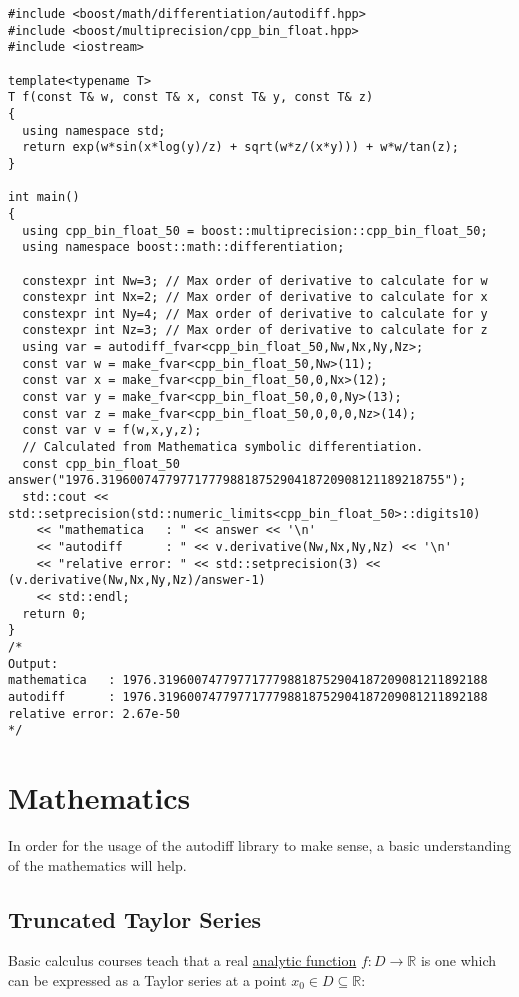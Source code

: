 \documentclass{article}
\begin{document}
\begin{verbatim}
#include <boost/math/differentiation/autodiff.hpp>
#include <boost/multiprecision/cpp_bin_float.hpp>
#include <iostream>

template<typename T>
T f(const T& w, const T& x, const T& y, const T& z)
{
  using namespace std;
  return exp(w*sin(x*log(y)/z) + sqrt(w*z/(x*y))) + w*w/tan(z);
}

int main()
{
  using cpp_bin_float_50 = boost::multiprecision::cpp_bin_float_50;
  using namespace boost::math::differentiation;

  constexpr int Nw=3; // Max order of derivative to calculate for w
  constexpr int Nx=2; // Max order of derivative to calculate for x
  constexpr int Ny=4; // Max order of derivative to calculate for y
  constexpr int Nz=3; // Max order of derivative to calculate for z
  using var = autodiff_fvar<cpp_bin_float_50,Nw,Nx,Ny,Nz>;
  const var w = make_fvar<cpp_bin_float_50,Nw>(11);
  const var x = make_fvar<cpp_bin_float_50,0,Nx>(12);
  const var y = make_fvar<cpp_bin_float_50,0,0,Ny>(13);
  const var z = make_fvar<cpp_bin_float_50,0,0,0,Nz>(14);
  const var v = f(w,x,y,z);
  // Calculated from Mathematica symbolic differentiation.
  const cpp_bin_float_50 answer("1976.319600747797717779881875290418720908121189218755");
  std::cout << std::setprecision(std::numeric_limits<cpp_bin_float_50>::digits10)
    << "mathematica   : " << answer << '\n'
    << "autodiff      : " << v.derivative(Nw,Nx,Ny,Nz) << '\n'
    << "relative error: " << std::setprecision(3) << (v.derivative(Nw,Nx,Ny,Nz)/answer-1)
    << std::endl;
  return 0;
}
/*
Output:
mathematica   : 1976.3196007477977177798818752904187209081211892188
autodiff      : 1976.3196007477977177798818752904187209081211892188
relative error: 2.67e-50
*/
\end{verbatim}

\section{Mathematics}

In order for the usage of the autodiff library to make sense, a basic understanding of the mathematics will help.

\subsection{Truncated Taylor Series}

Basic calculus courses teach that a real \href{https://en.wikipedia.org/wiki/Analytic_function}{analytic function}
$f : D\rightarrow\mathbb{R}$ is one which can be expressed as a Taylor series at a point
$x_0\in D\subseteq\mathbb{R}$:
\end{document}

